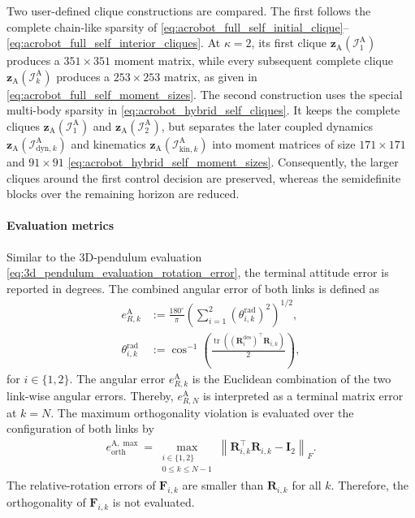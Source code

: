 Two user-defined clique constructions are compared. The first follows the
complete chain-like sparsity of
\eqref{eq:acrobot_full_self_initial_clique}--\eqref{eq:acrobot_full_self_interior_cliques}.
At $\kappa=2$, its first clique
$\bm{z}_{\mathrm{A}}(\mathcal I_1^{\mathrm{A}})$ produces a $351\times351$ moment
matrix, while every subsequent complete clique
$\bm{z}_{\mathrm{A}}(\mathcal I_k^{\mathrm{A}})$ produces a
$253\times253$ matrix, as given in
\eqref{eq:acrobot_full_self_moment_sizes}. The second construction uses the
special multi-body sparsity in \eqref{eq:acrobot_hybrid_self_cliques}. It keeps
the complete cliques $\bm{z}_{\mathrm{A}}(\mathcal I_1^{\mathrm{A}})$ and
$\bm{z}_{\mathrm{A}}(\mathcal I_2^{\mathrm{A}})$,
but separates the later coupled dynamics
$\bm{z}_{\mathrm{A}}(\mathcal I_{\mathrm{dyn},k}^{\mathrm{A}})$ and kinematics
$\bm{z}_{\mathrm{A}}(\mathcal I_{\mathrm{kin},k}^{\mathrm{A}})$ into moment matrices
of size $171\times171$ and $91\times91$
\eqref{eq:acrobot_hybrid_self_moment_sizes}. Consequently,
the larger cliques around the first control decision are preserved, whereas the
semidefinite blocks over the remaining horizon are reduced.

\paragraph{Evaluation metrics}
Similar to the $3$D-pendulum evaluation \eqref{eq:3d_pendulum_evaluation_rotation_error}, the terminal attitude error is
reported in degrees. The combined
angular error of both links is defined as
\begin{equation}
\begin{aligned}
e_{R,k}^{\mathrm A}
&:=
\frac{180^\circ}{\pi}
\left(
    \sum_{i=1}^{2}
    \left(\theta_{i,k}^{\mathrm{rad}}\right)^2
\right)^{1/2},
\\
\theta_{i,k}^{\mathrm{rad}}
&:=
\cos^{-1}\!\left(
\frac{
\operatorname{tr}\!\left(
(\bm R_i^{\mathrm{des}})^\top
\bm R_{i,k}
\right)
}{2}
\right),
\end{aligned}
\label{eq:acrobot_terminal_rotation_error}
\end{equation}
for $i\in\{1,2\}$.
The angular error $e_{R,k}^{\mathrm A}$ is the Euclidean combination of the two
link-wise angular errors. Thereby, $e_{R,N}^{\mathrm A}$ is interpreted as a
terminal matrix error at $k=N$.
The maximum orthogonality violation is evaluated over the configuration of both links by
\begin{equation}
\begin{aligned}
    e_{\mathrm{orth}}^{\mathrm A,\max}
    =\max_{\substack{i\in\{1,2\}\\0\leq k\leq N-1}}
    \left\|
        \bm R_{i,k}^{\top}\bm R_{i,k}-\bm I_2
    \right\|_F.
\end{aligned}
\label{eq:acrobot_max_orthogonality_error}
\end{equation}
The relative-rotation errors of $\bm{F}_{i,k}$ are smaller than $\bm{R}_{i,k}$ for all $k$.
Therefore, the orthogonality of $\bm{F}_{i,k}$ is not evaluated.

